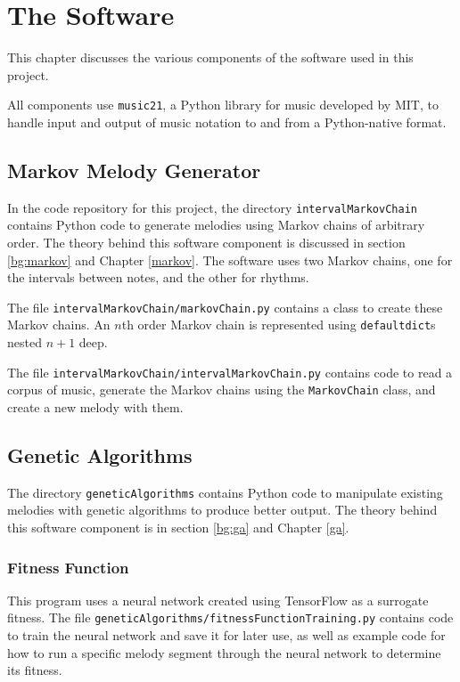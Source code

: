 \chapter{The Software} \label{software}


This chapter discusses the various components of the software used in this project.

All components use \texttt{music21}, a Python library for music developed by MIT, to handle input and output of music notation to and from a Python-native format.

\section{Markov Melody Generator}

In the code repository for this project, the directory \texttt{intervalMarkovChain} contains Python code to generate melodies using Markov chains of arbitrary order.
The theory behind this software component is discussed in section \ref{bg:markov} and Chapter \ref{markov}.
The software uses two Markov chains, one for the intervals between notes, and the other for rhythms.

The file \texttt{intervalMarkovChain/markovChain.py} contains a class to create these Markov chains.
An $n$th order Markov chain is represented using \texttt{defaultdict}s nested $n + 1$ deep.

The file \texttt{intervalMarkovChain/intervalMarkovChain.py} contains code to read a corpus of music, generate the Markov chains using the \texttt{MarkovChain} class, and create a new melody with them.

\section{Genetic Algorithms}

The directory \texttt{geneticAlgorithms} contains Python code to manipulate existing melodies with genetic algorithms to produce better output.
The theory behind this software component is in section \ref{bg:ga} and Chapter \ref{ga}.

\subsection{Fitness Function}

This program uses a neural network created using TensorFlow as a surrogate fitness.
The file \texttt{geneticAlgorithms/fitnessFunctionTraining.py} contains code to train the neural network and save it for later use, as well as example code for how to run a specific melody segment through the neural network to determine its fitness.

